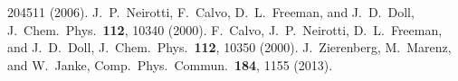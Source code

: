 204511 (2006).
%
%
J.~P.\ Neirotti, F.~Calvo, D.~L.\ Freeman, and J.~D.\ Doll, J.~Chem.\ Phys.\ 
\textbf{112}, 10340 (2000).
%
F.~Calvo, J.~P.\ Neirotti, D.~L.\ Freeman, and J.~D.\ Doll, J.~Chem.\ Phys.\ 
\textbf{112}, 10350 (2000).
%
%
%
J.~Zierenberg, M.~Marenz, and W.~Janke, Comp.\ Phys.\ Commun.\
\textbf{184}, 1155 (2013). 
%
%






